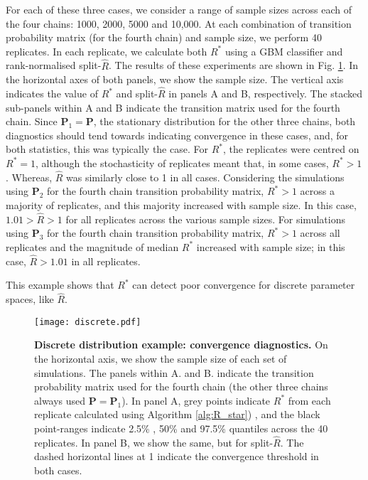 \documentclass{article}
\begin{document}
For each of these three cases, we consider a range of sample sizes across each of the four chains: 1000, 2000, 5000 and 10,000. At each combination of transition probability matrix (for the fourth chain) and sample size, we perform 40 replicates. In each replicate, we calculate both $R^*$ using a GBM classifier and rank-normalised split-$\widehat{R}$. The results of these experiments are shown in Fig. \ref{fig:discrete}. In the horizontal axes of both panels, we show the sample size. The vertical axis indicates the value of $R^*$ and split-$\widehat{R}$ in panels A and B, respectively. The stacked sub-panels within A and B indicate the transition matrix used for the fourth chain. Since $\boldsymbol{P}_1=\boldsymbol{P}$, the stationary distribution for the other three chains, both diagnostics should tend towards indicating convergence in these cases, and, for both statistics, this was typically the case. For $R^*$, the replicates were centred on $R^*=1$, although the stochasticity of replicates meant that, in some cases, $R^*>1$. Whereas, $\widehat{R}$ was similarly close to 1 in all cases. Considering the simulations using $\boldsymbol{P}_2$ for the fourth chain transition probability matrix, $R^*>1$ across a majority of replicates, and this majority increased with sample size. In this case, $1.01>\widehat{R}>1$ for all replicates across the various sample sizes. For simulations using $\boldsymbol{P}_3$ for the fourth chain transition probability matrix, $R^*>1$ across all replicates and the magnitude of median $R^*$ increased with sample size; in this case, $\widehat{R}>1.01$ in all replicates.

This example shows that $R^*$ can detect poor convergence for discrete parameter spaces, like $\widehat{R}$.


\begin{figure}[!htb]
	\centerline{\texttt{[image: discrete.pdf]}}
	\caption{\textbf{Discrete distribution example: convergence diagnostics.} On the horizontal axis, we show the sample size of each set of simulations. The panels within A. and B. indicate the transition probability matrix used for the fourth chain (the other three chains always used $\boldsymbol{P}=\boldsymbol{P}_1$). In panel A, grey points indicate $R^*$ from each replicate calculated using Algorithm \ref{alg:R_star}) , and the black point-ranges indicate 2.5\% , 50\% and 97.5\% quantiles across the 40 replicates. In panel B, we show the same, but for split-$\widehat{R}$. The dashed horizontal lines at 1 indicate the convergence threshold in both cases.}
	\label{fig:discrete}
\end{figure}
\end{document}
